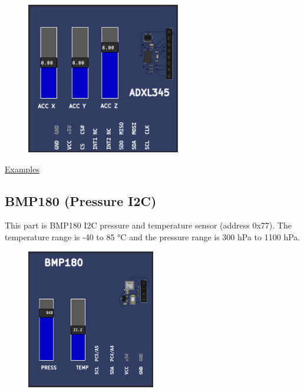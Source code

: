 \begin{figure}[H]
\center
\includegraphics[width=0.6\textwidth]{img/part_ADXL345.png} 
\end{figure} 


\href{https://lcgamboa.github.io/picsimlab_examples/parts_ADXL345_(Accel).html}{Examples}

\vspace{0.5cm}

\subsection{BMP180 (Pressure I2C)} 

This part is BMP180 I2C pressure and temperature sensor (address 0x77). 
The temperature  range is -40 to 85 °C  
and the pressure range is 300 hPa to 1100 hPa.

\begin{figure}[H]
\center
\includegraphics[width=0.5\textwidth]{img/part_bmp180.png} 
\end{figure} 


